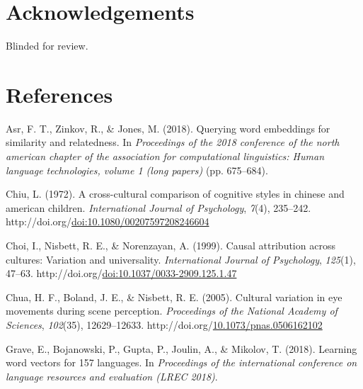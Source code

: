 \documentclass[10pt, letterpaper]{article}
\newenvironment{CSLReferences}%
  {}%
  {\par}
\begin{document}
\hypertarget{acknowledgements}{%
\section{Acknowledgements}\label{acknowledgements}}

Blinded for review.

\hypertarget{references}{%
\section{References}\label{references}}

\setlength{\parindent}{-0.1in} 
\setlength{\leftskip}{0.125in}

\noindent

\newpage

\hypertarget{refs}{}
\begin{CSLReferences}{1}{0}
\leavevmode{}%
Asr, F. T., Zinkov, R., \& Jones, M. (2018). Querying word embeddings
for similarity and relatedness. In \emph{Proceedings of the 2018
conference of the north american chapter of the association for
computational linguistics: Human language technologies, volume 1 (long
papers)} (pp. 675--684).

\leavevmode{}%
Chiu, L. (1972). A cross-cultural comparison of cognitive styles in
chinese and american children. \emph{International Journal of
Psychology}, \emph{7}(4), 235--242.
http://doi.org/\href{https://doi.org/doi:10.1080/00207597208246604}{doi:10.1080/00207597208246604}

\leavevmode{}%
Choi, I., Nisbett, R. E., \& Norenzayan, A. (1999). Causal attribution
across cultures: Variation and universality. \emph{International Journal
of Psychology}, \emph{125}(1), 47--63.
http://doi.org/\href{https://doi.org/doi:10.1037/0033-2909.125.1.47}{doi:10.1037/0033-2909.125.1.47}

\leavevmode{}%
Chua, H. F., Boland, J. E., \& Nisbett, R. E. (2005). Cultural variation
in eye movements during scene perception. \emph{Proceedings of the
National Academy of Sciences}, \emph{102}(35), 12629--12633.
http://doi.org/\href{https://doi.org/10.1073/pnas.0506162102}{10.1073/pnas.0506162102}

\leavevmode{}%
Grave, E., Bojanowski, P., Gupta, P., Joulin, A., \& Mikolov, T. (2018).
Learning word vectors for 157 languages. In \emph{Proceedings of the
international conference on language resources and evaluation (LREC
2018)}.


\end{CSLReferences}
\end{document}
